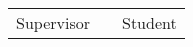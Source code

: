 \documentclass[12pt]{scrartcl}
\begin{document}
\newpage
{%
\renewcommand{\bibfont}{\normalfont\small}
\setlength{\biblabelsep}{5pt}
\setlength{\bibitemsep}{0.5\baselineskip plus 0.5\baselineskip} %
\setcounter{biburllcpenalty}{9000}
\setcounter{biburlucpenalty}{9999}
\printbibliography%
}

\vspace{6cm}

\begin{center}
	\begin{tabular}{l p{} r}
		\cline{1-1} \cline{3-3}
		\begin{minipage}[t]{0.4\textwidth}
			\centering
			\vspace{0cm}Supervisor
		\end{minipage}
		&
		\begin{minipage}[t]{0.2\textwidth}
		\end{minipage}
		&
		\begin{minipage}[t]{0.4\textwidth}
			\centering
			\vspace{0cm}Student
		\end{minipage}
	\end{tabular}
\end{center}
\end{document}

